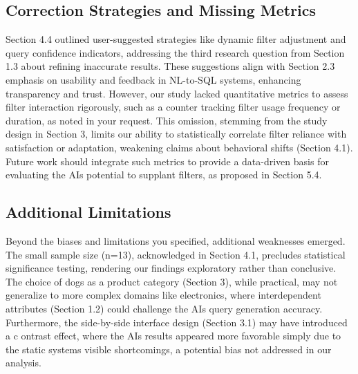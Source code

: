 \documentclass[../../submission.tex]{subfiles}
\begin{document}
\subsection{Correction Strategies and Missing Metrics}
Section 4.4 outlined user-suggested strategies like dynamic filter adjustment and query confidence 
indicators, addressing the third research question from Section 1.3 about refining inaccurate results. 
These suggestions align with Section 2.3 emphasis on usability and feedback in NL-to-SQL systems, 
enhancing transparency and trust. However, our study lacked quantitative metrics to assess filter 
interaction rigorously, such as a counter tracking filter usage frequency or duration, as noted in 
your request. This omission, stemming from the study design in Section 3, limits our ability to 
statistically correlate filter reliance with satisfaction or adaptation, weakening claims about 
behavioral shifts (Section 4.1). Future work should integrate such metrics to provide a data-driven basis 
for evaluating the AIs potential to supplant filters, as proposed in Section 5.4.

\subsection{Additional Limitations}
Beyond the biases and limitations you specified, additional weaknesses emerged. 
The small sample size (n=13), acknowledged in Section 4.1, precludes statistical 
significance testing, rendering our findings exploratory rather than conclusive. 
The choice of dogs as a product category (Section 3), while practical, may not generalize to 
more complex domains like electronics, where interdependent attributes (Section 1.2) could challenge the AIs 
query generation accuracy. Furthermore, the side-by-side interface design (Section 3.1) may have introduced a c
ontrast effect, where the AIs results appeared more favorable simply due to the static systems visible shortcomings, 
a potential bias not addressed in our analysis.
\end{document}
